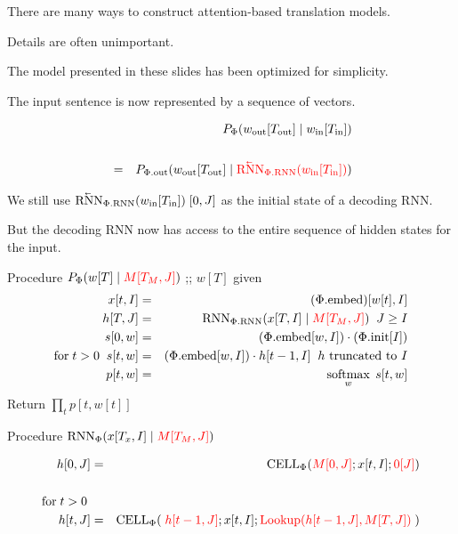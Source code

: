 {\vfill
There are many ways to construct attention-based translation models.

\vfill
Details are often unimportant.

\vfill
The model presented in these slides has been optimized for simplicity.



The input sentence is now represented by a sequence of vectors.

\vfill
\begin{eqnarray*}
 & & P_\Phi(w_{\mathrm{out}}[T_{\mathrm{out}}] \;|\; w_{\mathrm{in}}[T_{\mathrm{in}}]) \\
 \\
& = & P_{\Phi.\mathrm{out}}(w_{\mathrm{out}}[T_{\mathrm{out}}]\;|\;
{\color{red} \cev{\mathrm{RNN}}_{\Phi.\mathrm{RNN}}(w_{\mathrm{in}}[T_{\mathrm{in}}])})
\end{eqnarray*}

\vfill
We still use {\color{red} $\cev{\mathrm{RNN}}_{\Phi.\mathrm{RNN}}(w_{\mathrm{in}}[T_{\mathrm{in}}])\;[0,J]$} as the initial state of a decoding RNN.

\vfill
But the decoding RNN now has access to the entire sequence of hidden states for the input.


Procedure $P_\Phi(w[T] \;|\; {\color{red} M[T_M,J]})$ ;;{\color{red} $w[T]$ given}
{\huge \begin{eqnarray*}
x[t,I] & = & (\Phi.\mathrm{embed})[w[t],I] \\
h[T,J] & = & \mathrm{RNN}_{\Phi.\mathrm{RNN}}(x[T,I] \;|\;{\color{red} M[T_M,J]})\;\;J \geq I \\
s[0,w] & = & (\Phi.\mathrm{embed}[w,I])\cdot (\Phi.\mathrm{init}[I]) \\
\mathrm{for}\;t > 0\;\;s[t,w] & = & (\Phi.\mathrm{embed}[w,I]) \cdot h[t-1,I] \;\;\mbox{$h$ truncated to $I$}\\
p[t,w] & = & \operatorname*{softmax}_w\;s[t,w]
\end{eqnarray*}
}
Return $\prod_t p[t,w[t]]$


Procedure $\mathrm{RNN}_\Phi(x[T_x,I] \;|\; {\color{red} M[T_M,J]})$

\begin{eqnarray*}
h[0,J] & = & \mathrm{CELL}_\Phi({\color{red} M[0,J]};x[t,I];{\color{red} 0[J]}) \\
\\
\mbox{for}\;t > 0\;\\
h[t,J] & = & \mathrm{CELL}_\Phi(\;{\color{red} h[t-1,J]};x[t,I];{\color{red}\mathrm{Lookup}(h[t-1,J],M[T,J])}\;)\\
\end{eqnarray*}

}
